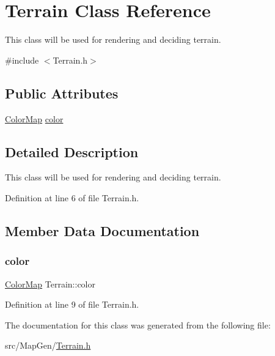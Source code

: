 \hypertarget{class_terrain}{}\section{Terrain Class Reference}
\label{class_terrain}


This class will be used for rendering and deciding terrain.  




{\ttfamily \#include $<$Terrain.\+h$>$}

\subsection*{Public Attributes}
\begin{DoxyCompactItemize}
\item 
\mbox{\hyperlink{struct_color_map}{Color\+Map}} \mbox{\hyperlink{class_terrain_acfff5254739b65f2a9e6ea841c66c6dd}{color}}
\end{DoxyCompactItemize}


\subsection{Detailed Description}
This class will be used for rendering and deciding terrain. 

Definition at line 6 of file Terrain.\+h.



\subsection{Member Data Documentation}
\mbox{\label{class_terrain_acfff5254739b65f2a9e6ea841c66c6dd}} 
\subsubsection{\texorpdfstring{color}{color}}
{\footnotesize\ttfamily \mbox{\hyperlink{struct_color_map}{Color\+Map}} Terrain\+::color}



Definition at line 9 of file Terrain.\+h.



The documentation for this class was generated from the following file\+:\begin{DoxyCompactItemize}
\item 
src/\+Map\+Gen/\mbox{\hyperlink{_terrain_8h}{Terrain.\+h}}\end{DoxyCompactItemize}
